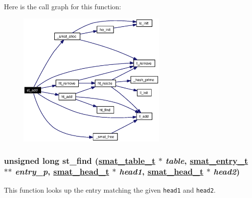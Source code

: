 Here is the call graph for this function:\begin{figure}[H]
\begin{center}
\leavevmode
\includegraphics[width=208pt]{group__dbprim__smat_ga11_cgraph}
\end{center}
\end{figure}
\hypertarget{group__dbprim__smat_ga13}{
\subsubsection[st\_\-find]{\setlength{\rightskip}{0pt plus 5cm}unsigned long st\_\-find (\hyperlink{struct__smat__table__s}{smat\_\-table\_\-t} $\ast$ {\em table}, \hyperlink{struct__smat__entry__s}{smat\_\-entry\_\-t} $\ast$$\ast$ {\em entry\_\-p}, \hyperlink{struct__smat__head__s}{smat\_\-head\_\-t} $\ast$ {\em head1}, \hyperlink{struct__smat__head__s}{smat\_\-head\_\-t} $\ast$ {\em head2})}}
\label{group__dbprim__smat_ga13}


This function looks up the entry matching the given {\tt head1} and {\tt head2}.

